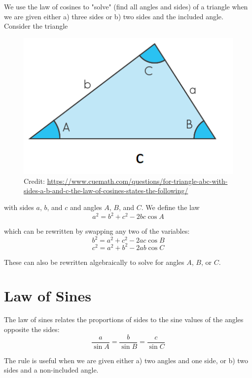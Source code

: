 \documentclass[12pt]{article}
\begin{document}
We use the law of cosines to "solve" (find all angles and sides) of a triangle when we are given either a) three sides or b) two sides and the included angle.\\

Consider the triangle\\

\begin{figure}[H]
	\centering
	\includegraphics[scale=0.6]{abc.png}
	\caption{Credit: \url{https://www.cuemath.com/questions/for-triangle-abc-with-sides-a-b-and-c-the-law-of-cosines-states-the-following/}}
\end{figure}

with sides \(a\), \(b\), and \(c\) and angles \(A\), \(B\), and \(C\). We define the law\\

\[a^2=b^2+c^2-2bc\cos A\]

which can be rewritten by swapping any two of the variables:\\

\[b^2=a^2+c^2-2ac\cos B\]
\[c^2=a^2+b^2-2ab\cos C\]

These can also be rewritten algebraically to solve for angles \(A\), \(B\), or \(C\).

\section{Law of Sines}

The law of sines relates the proportions of sides to the sine values of the angles opposite the sides:\\

\[\frac{a}{\sin A}=\frac{b}{\sin B}=\frac{c}{\sin C}\]

The rule is useful when we are given either a) two angles and one side, or b) two sides and a non-included angle.\\
\end{document}
